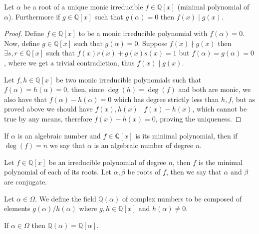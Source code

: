 \begin{proposition}
   Let \(\alpha\) be a root of a unique monic irreducible \(f \in
   \mathbb{Q}[x]\) (minimal polynomial of \(\alpha\)). Furthermore if \(g \in
   \mathbb{Q}[x]\) such that \(g(\alpha) = 0\) then \(f(x) \mid g(x)\).
\end{proposition}

\begin{proof}
   Define \(f \in \mathbb{Q}[x]\) to be a monic irreducible polynomial with
   \(f(\alpha) = 0\). Now, define \(g \in \mathbb{Q}[x]\) such that \(g(\alpha)
   = 0\). Suppose \(f(x) \nmid g(x)\) then \(\exists s, r \in \mathbb{Q}[x]\) 
   such that \(f(x)r(x) + g(x)s(x) = 1\) but \(f(\alpha) = g(\alpha) = 0\),
   where we get a trivial contradiction, thus \(f(x) \mid g(x)\).

   Let \(f, h \in \mathbb{Q}[x]\) be two monic irreducible polynomials such that
   \(f(\alpha) = h(\alpha) = 0\), then, since \(\deg(h) = \deg(f)\) and both are
   monic, we also have that \(f(\alpha) - h(\alpha) = 0\) which has degree
   strictly less than \(h, f\), but as proved above we should have \(f(x), h(x)
   \mid f(x) - h(x)\), which cannot be true by any means, therefore  \(f(x) -
   h(x) = 0\), proving the uniqueness.
\end{proof}

\begin{definition}
   If \(\alpha\) is an algebraic number and \(f \in \mathbb{Q}[x]\) is its
   minimal polynomial, then if \(\deg(f) = n\) we say that \(\alpha\) is an
   algebraic number of degree \(n\).
\end{definition}

\begin{definition}[Conjugate]
   Let \(f \in \mathbb{Q}[x]\) be an irreducible polynomial of degree \(n\),
   then \(f\) is the minimal polynomial of each of its roots. Let \(\alpha,
   \beta\) be roots of \(f\), then we say that \(\alpha\) and \(\beta\) are
   conjugate.
\end{definition}

\begin{definition}
   Let \(\alpha \in \Omega\). We define the field \(\mathbb{Q}(\alpha)\) of
   complex numbers to be composed of elements \(g(\alpha)/h(\alpha)\) where
   \(g, h \in \mathbb{Q}[x]\) and \(h(\alpha) \neq 0\). 
\end{definition}

\begin{proposition}
   If \(\alpha \in \Omega\) then \(\mathbb{Q}(\alpha) = \mathbb{Q}[\alpha]\).
\end{proposition}

